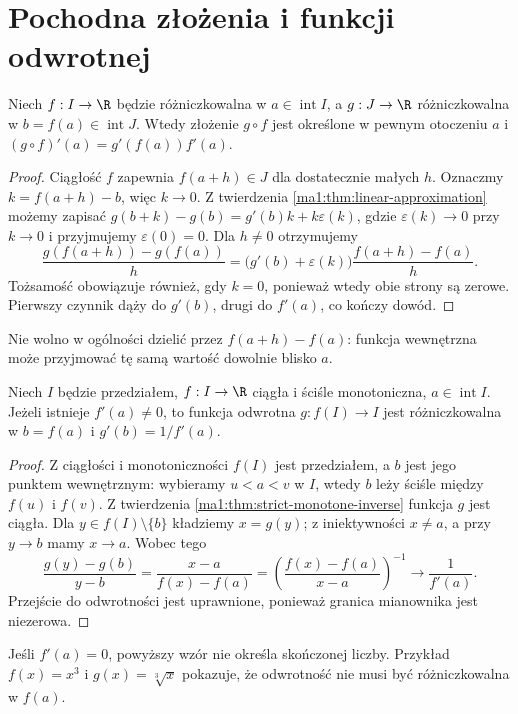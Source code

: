 \section{Pochodna złożenia i funkcji odwrotnej}
\begin{twierdzenie}
\label{ma1:thm:chain-rule}
Niech $f:I\to\R$ będzie różniczkowalna w $a\in\operatorname{int}I$, a $g:J\to\R$ różniczkowalna w $b=f(a)\in\operatorname{int}J$. Wtedy złożenie $g\circ f$ jest określone w pewnym otoczeniu $a$ i
$(g\circ f)'(a)=g'(f(a))f'(a)$.
\end{twierdzenie}
\begin{proof}
Ciągłość $f$ zapewnia $f(a+h)\in J$ dla dostatecznie małych $h$. Oznaczmy $k=f(a+h)-b$, więc $k\to0$. Z twierdzenia \ref{ma1:thm:linear-approximation} możemy zapisać
$g(b+k)-g(b)=g'(b)k+k\varepsilon(k)$,
gdzie $\varepsilon(k)\to0$ przy $k\to0$ i przyjmujemy $\varepsilon(0)=0$. Dla $h\ne0$ otrzymujemy
\[
 \frac{g(f(a+h))-g(f(a))}{h}
 =\bigl(g'(b)+\varepsilon(k)\bigr)
   \frac{f(a+h)-f(a)}h.
\]
Tożsamość obowiązuje również, gdy $k=0$, ponieważ wtedy obie strony są zerowe. Pierwszy czynnik dąży do $g'(b)$, drugi do $f'(a)$, co kończy dowód.
\end{proof}
Nie wolno w ogólności dzielić przez $f(a+h)-f(a)$: funkcja wewnętrzna może przyjmować tę samą wartość dowolnie blisko $a$.

\begin{twierdzenie}
\label{ma1:thm:inverse-derivative}
Niech $I$ będzie przedziałem, $f:I\to\R$ ciągła i ściśle monotoniczna, $a\in\operatorname{int}I$. Jeżeli istnieje $f'(a)\ne0$, to funkcja odwrotna $g:f(I)\to I$ jest różniczkowalna w $b=f(a)$ i $g'(b)=1/f'(a)$.
\end{twierdzenie}
\begin{proof}
Z ciągłości i monotoniczności $f(I)$ jest przedziałem, a $b$ jest jego punktem wewnętrznym: wybieramy $u<a<v$ w $I$, wtedy $b$ leży ściśle między $f(u)$ i $f(v)$. Z twierdzenia \ref{ma1:thm:strict-monotone-inverse} funkcja $g$ jest ciągła. Dla $y\in f(I)\setminus\{b\}$ kładziemy $x=g(y)$; z iniektywności $x\ne a$, a przy $y\to b$ mamy $x\to a$. Wobec tego
\[
 \frac{g(y)-g(b)}{y-b}
 =\frac{x-a}{f(x)-f(a)}
 =\left(\frac{f(x)-f(a)}{x-a}\right)^{-1}
 \longrightarrow\frac1{f'(a)}.
\]
Przejście do odwrotności jest uprawnione, ponieważ granica mianownika jest niezerowa.
\end{proof}
Jeśli $f'(a)=0$, powyższy wzór nie określa skończonej liczby. Przykład $f(x)=x^3$ i $g(x)=\sqrt[3]x$ pokazuje, że odwrotność nie musi być różniczkowalna w $f(a)$.

